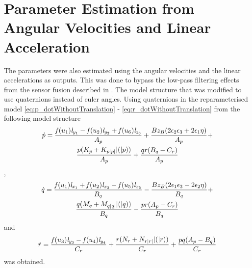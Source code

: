 \section{Parameter Estimation from Angular Velocities and Linear Acceleration}
The parameters were also estimated using the angular velocities and the linear accelerations as outputs. This was done to bypass the low-pass filtering effects from the sensor fusion described in . The model structure that was modified to use quaternions instead of euler angles. Using quaternions in the reparameterised model \eqref{eq:p_dotWithoutTranslation} - \eqref{eq:r_dotWithoutTranslation} from  the following model structure
\begin{multline}
\dot{p} = \frac{\mathit{f}(u_{1}) \mathit{l}_{y_{1}} - \mathit{f}(u_{2}) \mathit{l}_{y_{2}} + \mathit{f}(u_{6}) \mathit{l}_{z_{6}}}{A_p} + \frac{B z_B (2 \epsilon_2 \epsilon_3 + 2 \epsilon_1 \eta)}{A_p} + \\ \frac{p (K_{p} + K_{p|p|} |(|p))}{A_p} + \frac{q r (B_q - C_r)}{A_p}
\end{multline},
\begin{multline}
\dot{q} = \frac{\mathit{f}(u_{1}) \mathit{l}_{x_{1}} + \mathit{f}(u_{2}) \mathit{l}_{x_{2}} - \mathit{f}(u_{5}) \mathit{l}_{x_{5}}}{B_q} - \frac{B z_B (2 \epsilon_1 \epsilon_3 - 2 \epsilon_2 \eta)}{B_q} + \\ \frac{q (M_{q} + M_{q|q|} |(|q))}{B_q} - \frac{p r (A_p - C_r)}{B_q}
\end{multline}
and
\begin{multline}
\dot{r} = \frac{\mathit{f}(u_{3}) \mathit{l}_{y_{3}} - \mathit{f}(u_{4}) \mathit{l}_{y_{4}}}{C_r} + \frac{r (N_{r} + N_{r|r|} |(|r))}{C_r} + \frac{p q (A_p  - B_q)}{C_r}
\end{multline} was obtained.

